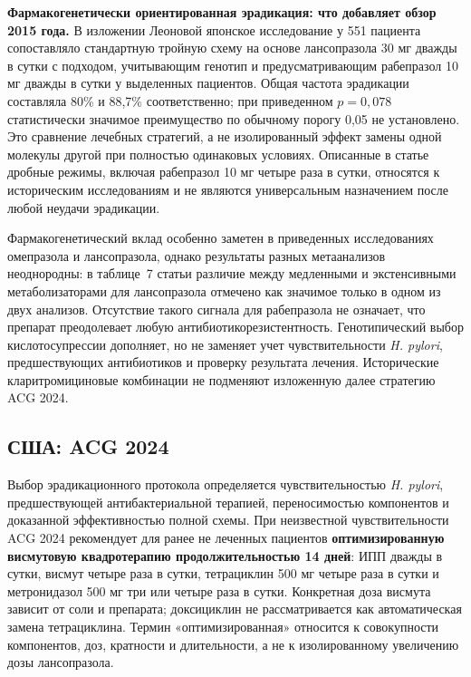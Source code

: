 \documentclass[11pt,a4paper,notitlepage]{report}
\newcommand{\Hp}{\textit{H. pylori}}
\newcommand{\src}[1]{\unskip\space\cite{#1}}
\begin{document}
\textbf{Фармакогенетически ориентированная эрадикация: что добавляет обзор 2015 года.} В изложении Леоновой японское исследование у 551 пациента сопоставляло стандартную тройную схему на основе лансопразола 30 мг дважды в сутки с подходом, учитывающим генотип и предусматривающим рабепразол 10 мг дважды в сутки у выделенных пациентов. Общая частота эрадикации составляла 80\% и 88,7\% соответственно; при приведенном $p=0{,}078$ статистически значимое преимущество по обычному порогу 0,05 не установлено. Это сравнение лечебных стратегий, а не изолированный эффект замены одной молекулы другой при полностью одинаковых условиях. Описанные в статье дробные режимы, включая рабепразол 10 мг четыре раза в сутки, относятся к историческим исследованиям и не являются универсальным назначением после любой неудачи эрадикации.\src{leonova2015}

Фармакогенетический вклад особенно заметен в приведенных исследованиях омепразола и лансопразола, однако результаты разных метаанализов неоднородны: в таблице~7 статьи различие между медленными и экстенсивными метаболизаторами для лансопразола отмечено как значимое только в одном из двух анализов. Отсутствие такого сигнала для рабепразола не означает, что препарат преодолевает любую антибиотикорезистентность. Генотипический выбор кислотосупрессии дополняет, но не заменяет учет чувствительности \Hp, предшествующих антибиотиков и проверку результата лечения. Исторические кларитромициновые комбинации не подменяют изложенную далее стратегию ACG 2024.\src{leonova2015,acghp,maastricht}

\subsection{США: ACG 2024}
Выбор эрадикационного протокола определяется чувствительностью \Hp, предшествующей антибактериальной терапией, переносимостью компонентов и доказанной эффективностью полной схемы. При неизвестной чувствительности ACG 2024 рекомендует для ранее не леченных пациентов \textbf{оптимизированную висмутовую квадротерапию продолжительностью 14 дней}: ИПП дважды в сутки, висмут четыре раза в сутки, тетрациклин 500 мг четыре раза в сутки и метронидазол 500 мг три или четыре раза в сутки. Конкретная доза висмута зависит от соли и препарата; доксициклин не рассматривается как автоматическая замена тетрациклина. Термин «оптимизированная» относится к совокупности компонентов, доз, кратности и длительности, а не к изолированному увеличению дозы лансопразола.\src{acghp}
\end{document}
